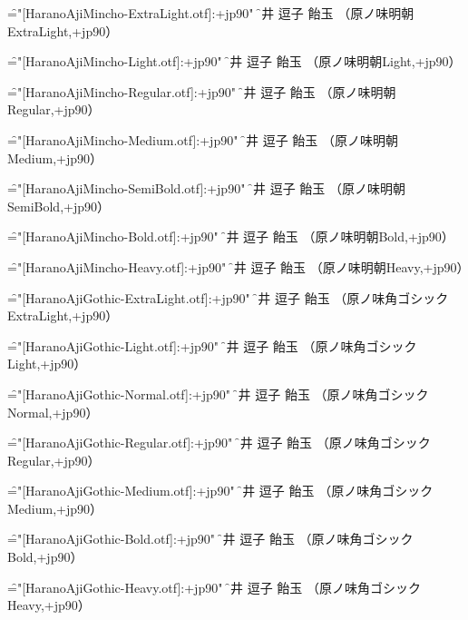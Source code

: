 \font\f="[HaranoAjiMincho-ExtraLight.otf]:+jp90" \f
辻井 逗子 飴玉 （原ノ味明朝ExtraLight,+jp90）\par

\font\f="[HaranoAjiMincho-Light.otf]:+jp90" \f
辻井 逗子 飴玉 （原ノ味明朝Light,+jp90）\par

\font\f="[HaranoAjiMincho-Regular.otf]:+jp90" \f
辻井 逗子 飴玉 （原ノ味明朝Regular,+jp90）\par

\font\f="[HaranoAjiMincho-Medium.otf]:+jp90" \f
辻井 逗子 飴玉 （原ノ味明朝Medium,+jp90）\par

\font\f="[HaranoAjiMincho-SemiBold.otf]:+jp90" \f
辻井 逗子 飴玉 （原ノ味明朝SemiBold,+jp90）\par

\font\f="[HaranoAjiMincho-Bold.otf]:+jp90" \f
辻井 逗子 飴玉 （原ノ味明朝Bold,+jp90）\par

\font\f="[HaranoAjiMincho-Heavy.otf]:+jp90" \f
辻井 逗子 飴玉 （原ノ味明朝Heavy,+jp90）\par


\font\f="[HaranoAjiGothic-ExtraLight.otf]:+jp90" \f
辻井 逗子 飴玉 （原ノ味角ゴシックExtraLight,+jp90）\par

\font\f="[HaranoAjiGothic-Light.otf]:+jp90" \f
辻井 逗子 飴玉 （原ノ味角ゴシックLight,+jp90）\par

\font\f="[HaranoAjiGothic-Normal.otf]:+jp90" \f
辻井 逗子 飴玉 （原ノ味角ゴシックNormal,+jp90）\par

\font\f="[HaranoAjiGothic-Regular.otf]:+jp90" \f
辻井 逗子 飴玉 （原ノ味角ゴシックRegular,+jp90）\par

\font\f="[HaranoAjiGothic-Medium.otf]:+jp90" \f
辻井 逗子 飴玉 （原ノ味角ゴシックMedium,+jp90）\par

\font\f="[HaranoAjiGothic-Bold.otf]:+jp90" \f
辻井 逗子 飴玉 （原ノ味角ゴシックBold,+jp90）\par

\font\f="[HaranoAjiGothic-Heavy.otf]:+jp90" \f
辻井 逗子 飴玉 （原ノ味角ゴシックHeavy,+jp90）\par

\bye
